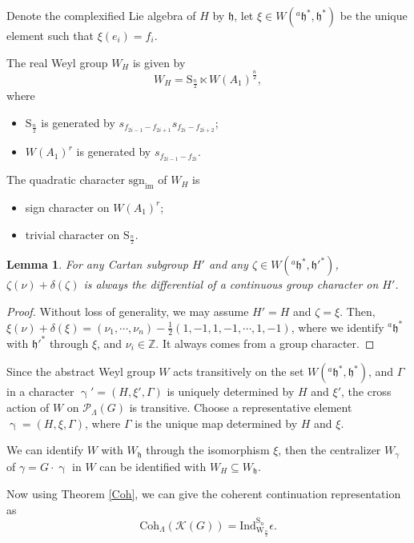 \documentclass[12pt, a4paper]{amsart}
\numberwithin{equation}{section}
\newtheorem{lem}[thm]{Lemma}
\newcommand{\BZ}{{\mathbb {Z}}}
\newcommand{\CK}{{\mathcal {K}}}
\newcommand{\CP}{{\mathcal {P}}}
\newcommand{\fh}{\mathfrak{h}}
\newcommand{\Ind}{{\mathrm{Ind}}}
\newcommand{\sgn}{{\mathrm{sgn}}}
\begin{document}
Denote the complexified Lie algebra of $H$ by $\fh$, let $\xi \in W({^{a}\fh^*},\fh^*)$ be the unique element such that $\xi(e_i) = f_i$.

The real Weyl group $W_{H}$ is given by
$$W_{H} = \mathrm{S}_{\frac{n}{2}} \ltimes W(A_1)^{\frac{n}{2}},$$
where 
\begin{itemize}
    \item $\mathrm{S}_{\frac{n}{2}}$ is generated by $s_{f_{2i-1}-f_{2i+1}}s_{f_{2i}-f_{2i+2}}$;
    \item $W(A_1)^r$ is generated by $s_{f_{2i-1}-f_{2i}}$.
\end{itemize}



The quadratic character $\sgn_{\mathrm{im}}$ of $W_{H}$ is 
\begin{itemize}
    \item sign character on $W(A_1)^r$;
    \item trivial character on $\mathrm{S}_{\frac{n}{2}}$.
\end{itemize}

\begin{lem}
For any Cartan subgroup $H'$ and any $\zeta \in W({^{a}\fh^*,\fh'^*})$, $\zeta(\nu) + \delta(\zeta)$ is always the differential of a continuous group character on $H'$.
\end{lem}

\begin{proof}
    Without loss of generality, we may assume $H' = H$ and $\zeta = \xi$. Then, $\xi(\nu) + \delta(\xi) = (\nu_1,\cdots,\nu_n) - \frac{1}{2}(1,-1,1,-1,\cdots,1,-1)$, where we identify ${^{a}\fh^*}$ with $\fh'^*$ through $\xi$, and $\nu_i \in \BZ$. It always comes from a group character.
\end{proof}


Since the abstract Weyl group $W$ acts transitively on the set $W({^{a}\fh}^*,\fh^*)$, and $\Gamma$ in a character $\upgamma' = (H,\xi',\Gamma)$ is uniquely determined by $H$ and $\xi'$, the cross action of $W$ on $\CP_{\Lambda}(G)$ is transitive.  Choose a representative element $\upgamma = (H,\xi,\Gamma)$, where $\Gamma$ is the unique map determined by $H$ and $\xi$.

We can identify $W$ with $W_{\fh}$ through the isomorphism $\xi$, then the centralizer $W_{{\gamma}}$ of $\gamma = G \cdot \upgamma$ in $W$ can be identified with $W_{H} \subseteq W_{\fh}$.

Now using Theorem \ref{Coh}, we can give the coherent continuation representation as 
\begin{equation}
    \mathrm{Coh}_{\Lambda}(\CK(G)) = \Ind_{\mathrm{W}_{\frac{n}{2}}}^{\mathrm{S}_n} \epsilon.
\end{equation}
\end{document}
